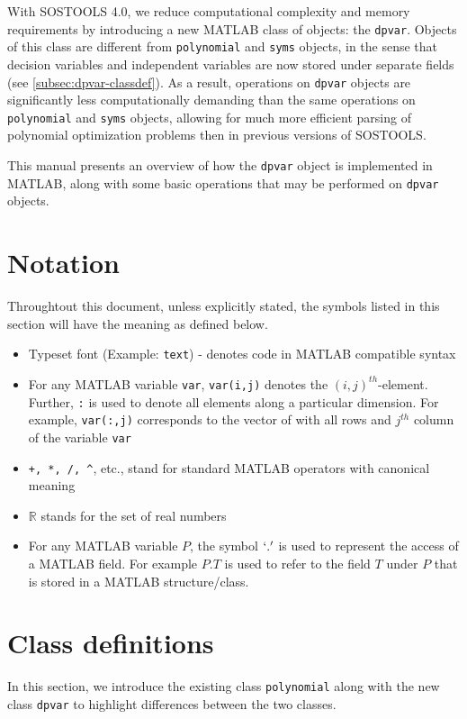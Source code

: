 \documentclass{article}
\newcommand{\R}{\mathbb{R}}
\begin{document}
	With SOSTOOLS 4.0, we reduce computational complexity and memory requirements by introducing a new MATLAB class of objects: the \texttt{dpvar}. Objects of this class are different from \texttt{polynomial} and \texttt{syms} objects, in the sense that decision variables and independent variables are now stored under separate fields (see \ref{subsec:dpvar-classdef}). As a result, operations on \texttt{dpvar} objects are significantly less computationally demanding than the same operations on \texttt{polynomial} and \texttt{syms} objects, allowing for much more efficient parsing of polynomial optimization problems then in previous versions of SOSTOOLS.
	
	This manual presents an overview of how the \texttt{dpvar} object is implemented in MATLAB, along with some basic operations that may be performed on \texttt{dpvar} objects.


	\section{Notation}\label{sec:notation}
	Throughtout this document, unless explicitly stated, the symbols listed in this section will have the meaning as defined below.
	\begin{itemize}
		\item Typeset font (Example: \texttt{text}) - denotes code in MATLAB compatible syntax
		\item For any MATLAB variable \texttt{var}, \texttt{var(i,j)} denotes the $(i,j)^{th}$-element. Further, \texttt{:} is used to denote all elements along a particular dimension. For example, \texttt{var(:,j)} corresponds to the vector of with all rows and $j^{th}$ column of the variable \texttt{var}
		\item \texttt{+, *, /, \^}, etc., stand for standard MATLAB operators with canonical meaning
		\item $\R$ stands for the set of real numbers
		\item For any MATLAB variable $P$, the symbol $`.'$ is used to represent the access of a MATLAB field. For example $P.T$ is used to refer to the field $T$ under $P$ that is stored in a MATLAB structure/class.
	\end{itemize}

	\section{Class definitions}\label{sec:classdef}
	In this section, we introduce the existing class \texttt{polynomial} along with the new class \texttt{dpvar} to highlight differences between the two classes.
\end{document}
